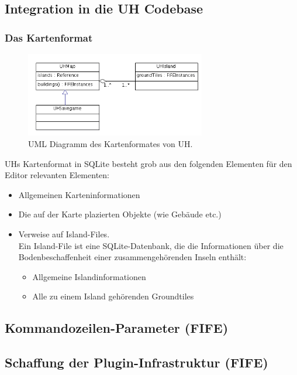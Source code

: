 \subsection{Integration in die UH Codebase}
\subsubsection{Das Kartenformat}
\label{kartenformat}

%
%
\begin{figure}[htbp]
  \centering

    \includegraphics[width=0.7\textwidth]{gfx/klassendiagramm-UHSaveGame.png}

  \caption{UML Diagramm des Kartenformates von UH.}
  \label{figure:automaton-intersection}
\end{figure}

UHs Kartenformat in SQLite besteht grob aus den folgenden Elementen für den
Editor relevanten Elementen:
\begin{itemize}
  \item Allgemeinen Karteninformationen
  \item Die auf der Karte plazierten Objekte (wie Gebäude etc.)
  \item Verweise auf Island-Files. \\
  Ein Island-File ist eine SQLite-Datenbank,
  die die Informationen über die Bodenbeschaffenheit einer zusammengehörenden
  Inseln enthält:
  \begin{itemize}
    \item Allgemeine Islandinformationen
    \item Alle zu einem Island gehörenden Groundtiles
  \end{itemize}
\end{itemize}

\subsection{Kommandozeilen-Parameter (FIFE)}
\subsection{Schaffung der Plugin-Infrastruktur (FIFE)}

